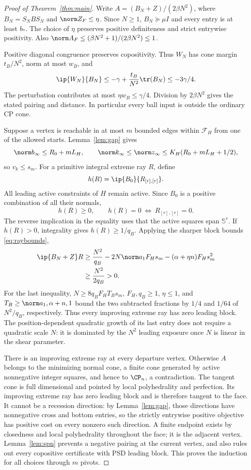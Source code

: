 \begin{proof}[Proof of Theorem~\ref{thm:main}]
Write $A=(B_N+Z)/(2\beta N^2)$, where $B_N=S_NBS_N$ and $\norm Z_F\le\eta$. Since $N\ge1$, $B_N\succeq\mu I$ and every entry is at least $b_*$. The choice of $\eta$ preserves positive definiteness and strict entrywise positivity. Also $\norm A_F\le(\beta N^2+1)/(2\beta N^2)\le1$.

Positive diagonal congruence preserves copositivity. Thus $W_N$ has cone margin $t_B/N^2$, norm at most $w_B$, and
\[
 \ip{W_N}{B_N}\le-\gamma+\frac{t_B}{N^2}\tr(B_N)
 \le-3\gamma/4.
\]
The perturbation contributes at most $\eta w_B\le\gamma/4$. Division by $2\beta N^2$ gives the stated pairing and distance. In particular every ball input is outside the ordinary CP cone.

Suppose a vertex is reachable in at most $m$ bounded edges within $\mathcal F_H$ from one of the allowed starts. Lemma~\ref{lem:gap} gives
\[
 \norm b_\infty\le R_0+mL_H,\qquad
 \norm k_\infty\le\norm z_\infty
 \le K_H(R_0+mL_H+1/2),
\]
so $v_k\le s_m$. For a primitive integral extreme ray $R$, define
\[
 h(R)=\ip{B_0}{R_{[r],[r]}}.
\]
All leading active constraints of $H$ remain active. Since $B_0$ is a positive combination of all their normals,
\begin{equation}\label{eq:exposure}
 h(R)\ge0,\qquad h(R)=0\ \Longleftrightarrow\ R_{[r],[r]}=0.
\end{equation}
The reverse implication in the equality uses that the active squares span $\mathbb S^r$. If $h(R)>0$, integrality gives $h(R)\ge1/q_B$. Applying the sharper block bounds \eqref{eq:raybounds},
\[
 \begin{split}
 \ip{B_N+Z}R
 &\ge\frac{N^2}{q_B}
       -2N\norm a_1F_Hs_m
       -(\alpha+\eta n)F_Hs_m^2\\
 &\ge\frac{N^2}{2q_B}>0.
 \end{split}
\]
For the last inequality, $N\ge8q_BF_HT_Bs_m$, $F_H,q_B\ge1$, $\eta\le1$, and $T_B\ge\norm a_1,\alpha+n,1$ bound the two subtracted fractions by $1/4$ and $1/64$ of $N^2/q_B$, respectively. Thus every improving extreme ray has zero leading block. The position-dependent quadratic growth of its last entry does not require a quadratic scale $N$: it is dominated by the $N^2$ leading exposure once $N$ is linear in the shear parameter.

There is an improving extreme ray at every departure vertex. Otherwise $A$ belongs to the minimizing normal cone, a finite cone generated by active nonnegative integer squares, and hence to $\CP_n$, a contradiction. The tangent cone is full dimensional and pointed by local polyhedrality and perfection. Its improving extreme ray has zero leading block and is therefore tangent to the face. It cannot be a recession direction: by Lemma~\ref{lem:gap}, those directions have nonnegative cross and bottom entries, so the strictly entrywise positive objective has positive cost on every nonzero such direction. A finite endpoint exists by closedness and local polyhedrality throughout the face; it is the adjacent vertex. Lemma~\ref{lem:spn} prevents a negative pairing at the current vertex, and also rules out every copositive certificate with PSD leading block. This proves the induction for all choices through $m$ pivots.


\end{proof}
